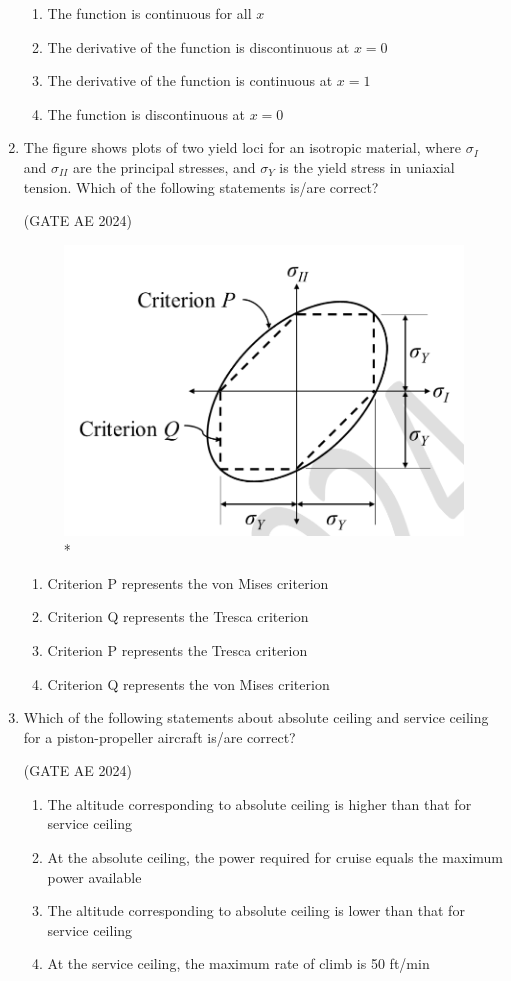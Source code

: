 \documentclass[journal,12pt,onecolumn]{IEEEtran}
\theoremstyle{remark}
\begin{document}
\begin{flushleft}
\begin{enumerate}
\begin{enumerate}
\item The function is continuous for all $x$  
\item The derivative of the function is discontinuous at $x = 0$  
\item The derivative of the function is continuous at $x = 1$  
\item The function is discontinuous at $x = 0$ 
\end{enumerate}

\item The figure shows plots of two yield loci for an isotropic material, where $\sigma_I$ and $\sigma_{II}$ are the principal stresses, and $\sigma_Y$ is the yield stress in uniaxial tension. Which of the following statements is/are correct?  

\hfill (GATE AE 2024)

\begin{figure}
\includegraphics[width=0.5\columnwidth]{figs/46.png}
\caption{*}
    \label{fig:placeholder}
\end{figure}

\begin{enumerate}
\item Criterion P represents the von Mises criterion  
\item Criterion Q represents the Tresca criterion  
\item Criterion P represents the Tresca criterion  
\item Criterion Q represents the von Mises criterion  
\end{enumerate} 

\item Which of the following statements about absolute ceiling and service ceiling for a piston-propeller aircraft is/are correct?  

\hfill (GATE AE 2024)

\begin{enumerate}
    \item The altitude corresponding to absolute ceiling is higher than that for service ceiling  
    \item At the absolute ceiling, the power required for cruise equals the maximum power available  
    \item The altitude corresponding to absolute ceiling is lower than that for service ceiling  
    \item At the service ceiling, the maximum rate of climb is 50 ft/min  
\end{enumerate}


\end{enumerate}
\end{flushleft}
\end{document}
